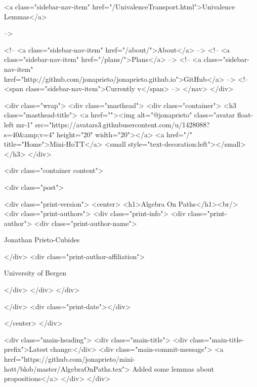       
    
      
        
          <a class="sidebar-nav-item" href="/UnivalenceTransport.html">Univalence Lemmas</a>
        
      
     -->

    <!-- <a class="sidebar-nav-item" href="/about/">About</a> -->
    <!-- <a class="sidebar-nav-item" href="/plans/">Plans</a> -->
    <!-- <a class="sidebar-nav-item" href="http://github.com/jonaprieto/jonaprieto.github.io">GitHub</a> -->
    <!-- <span class="sidebar-nav-item">Currently v</span> -->
  </nav>
</div>

    <div class="wrap">
      <div class="masthead">
        <div class="container">
          <h3 class="masthead-title">
            <a href=""><img alt="@jonaprieto" class="avatar float-left mr-1" src="https://avatars3.githubusercontent.com/u/1428088?s=40&amp;v=4" height="20" width="20"></a>
            <a href="/" title="Home">Mini-HoTT</a>
            <small style="text-decoration:left"></small>
          </h3>
        </div>
      
      <div class="container content">
        







<div class="post">

  <div class="print-version">
    <center>
      <h1>Algebra On Paths</h1><br/>
        <div class="print-authors">
          <div class="print-info">
            <div class="print-author">
              <div class="print-author-name">
                
                  Jonathan Prieto-Cubides
                
              </div>
              <div class="print-author-affiliation">
                
                  University of Bergen
                
                </div>
            </div>
          </div>
          
          
        </div>
        <div class="print-date"></div>
        
        
    </center>
  </div>

  
  <div class="main-heading">
    <div class="main-title">
      <div class="main-title-prefix">Latest change:</div>
      <div class="main-commit-message">
            <a href="https://github.com/jonaprieto/mini-hott/blob/master/AlgebraOnPaths.tex">
              Added some lemmas about propositions</a>
      </div>
    </div>

